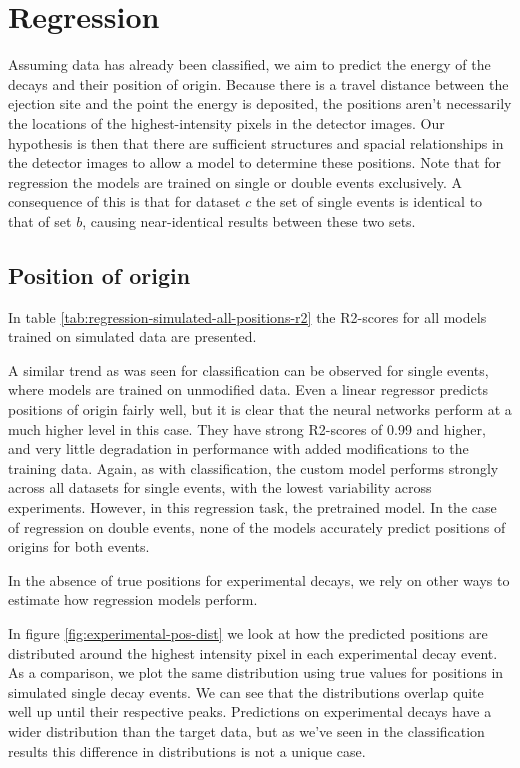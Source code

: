 \section{Regression}
Assuming data has already been classified, we aim to predict the energy of the decays and their
position of origin. Because there is a travel distance between the 
ejection site and the point the energy is deposited, the positions aren't necessarily
the locations of the highest-intensity pixels in the detector images. Our hypothesis is
then that there are sufficient structures and spacial relationships in the detector images to
allow a model to determine these positions.
Note that for regression the models are trained on single or double events exclusively.
A consequence of this is that for dataset $c$ the set of single events is
identical to that of set $b$, causing near-identical results between these two sets.

\subsection{Position of origin}
In table \ref{tab:regression-simulated-all-positions-r2} the R2-scores for all models
trained on simulated data are presented.

\noindent A similar trend as was seen for classification
can be observed for single events, where models are trained on unmodified data. Even
a linear regressor predicts positions of origin fairly well, but it is clear
that the neural networks perform at a much higher level in this case. They have strong
R2-scores of 0.99 and higher, and very little degradation in performance with added 
modifications to the training data. Again, as with classification, the custom model
performs strongly across all datasets for single events, with the lowest variability across
experiments. However, in this regression task, the pretrained model.
In the case of regression on double events, none of the models accurately
predict positions of origins for both events.

In the absence of true positions for experimental decays, we rely on other
ways to estimate how regression models perform.

In figure \ref{fig:experimental-pos-dist} we look at how the predicted positions
are distributed around the highest intensity pixel in each experimental decay event.
As a comparison, we plot the same distribution using true values for positions in
simulated single decay events. We can see that the distributions overlap quite well
up until their respective peaks. Predictions on experimental decays have a wider
distribution than the target data, but as we've seen in the classification results this
difference in distributions is not a unique case.


